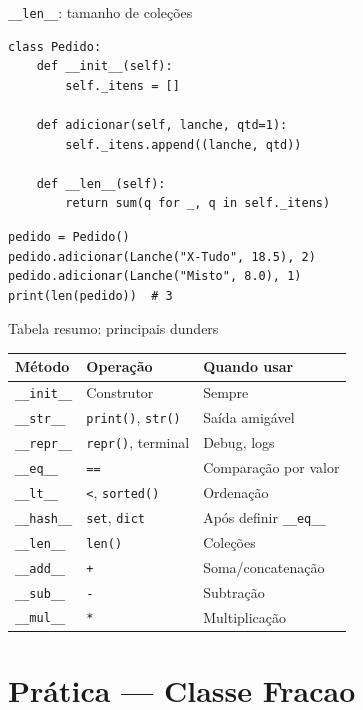 \documentclass[aspectratio=169]{beamer}
\begin{document}
\begin{frame}[fragile]{\texttt{\_\_len\_\_}: tamanho de coleções}
\begin{lstlisting}
class Pedido:
    def __init__(self):
        self._itens = []

    def adicionar(self, lanche, qtd=1):
        self._itens.append((lanche, qtd))

    def __len__(self):
        return sum(q for _, q in self._itens)
\end{lstlisting}

\begin{lstlisting}
pedido = Pedido()
pedido.adicionar(Lanche("X-Tudo", 18.5), 2)
pedido.adicionar(Lanche("Misto", 8.0), 1)
print(len(pedido))  # 3
\end{lstlisting}
\end{frame}

\begin{frame}{Tabela resumo: principais dunders}
\begin{center}
\scriptsize
\begin{tabular}{lll}
\toprule
\textbf{Método} & \textbf{Operação} & \textbf{Quando usar} \\
\midrule
\texttt{\_\_init\_\_}  & Construtor          & Sempre \\
\texttt{\_\_str\_\_}   & \texttt{print()}, \texttt{str()} & Saída amigável \\
\texttt{\_\_repr\_\_}  & \texttt{repr()}, terminal & Debug, logs \\
\texttt{\_\_eq\_\_}    & \texttt{==}         & Comparação por valor \\
\texttt{\_\_lt\_\_}    & \texttt{<}, \texttt{sorted()} & Ordenação \\
\texttt{\_\_hash\_\_}  & \texttt{set}, \texttt{dict} & Após definir \texttt{\_\_eq\_\_} \\
\texttt{\_\_len\_\_}   & \texttt{len()}      & Coleções \\
\texttt{\_\_add\_\_}   & \texttt{+}          & Soma/concatenação \\
\texttt{\_\_sub\_\_}   & \texttt{-}          & Subtração \\
\texttt{\_\_mul\_\_}   & \texttt{*}          & Multiplicação \\
\bottomrule
\end{tabular}
\end{center}
\end{frame}

\section{Prática --- Classe Fracao}
\end{document}
